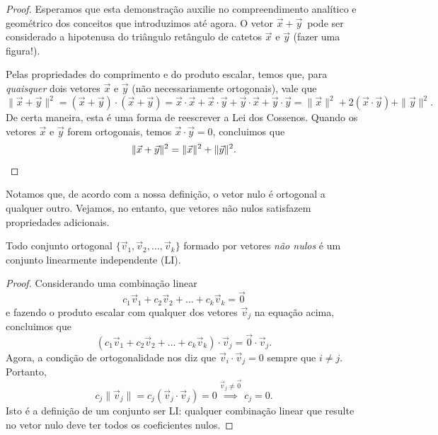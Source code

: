 \begin{proof}
	Esperamos que esta demonstração auxilie no compreendimento analítico e geométrico dos conceitos que introduzimos até agora. O vetor $\vec{x} + \vec{y} \,$ pode ser considerado a hipotenusa do triângulo retângulo de catetos $\vec{x}$ e $\vec{y}$ (fazer uma figura!).

	Pelas propriedades do comprimento e do produto escalar, temos que, para \textit{quaisquer} dois vetores $\vec{x}$ e $\vec{y}$ (não necessariamente ortogonais), vale que
	\begin{equation}
	\|\vec{x} + \vec{y}\|^2 = (\vec{x} + \vec{y}) \cdot (\vec{x} + \vec{y}) =  \vec{x} \cdot \vec{x} + \vec{x} \cdot \vec{y} +  \vec{y} \cdot \vec{x} +  \vec{y} \cdot \vec{y} = \|\vec{x}\|^2 + 2 (\vec{x} \cdot \vec{y}) + \|\vec{y}\|^2.
	\end{equation} De certa maneira, esta é uma forma de reescrever a Lei dos Cossenos. Quando os vetores $\vec{x}$ e $\vec{y}$ forem ortogonais, temos $\vec{x} \cdot \vec{y} = 0$, concluimos que
	\begin{equation}
	\|\vec{x} + \vec{y}\|^2 = \|\vec{x}\|^2 + \|\vec{y}\|^2. \qedhere
	\end{equation}
\end{proof}


Notamos que, de acordo com a nossa definição, o vetor nulo é ortogonal a qualquer outro. Vejamos, no entanto, que vetores não nulos satisfazem propriedades adicionais.

\begin{teo}
	Todo conjunto ortogonal $\{\vec{v}_1, \vec{v}_2, \dots, \vec{v}_k\}$ formado por vetores \textit{não nulos} é um conjunto linearmente independente (LI).
\end{teo}

\begin{proof}
	Considerando uma combinação linear
	\begin{equation}
	c_1 \vec{v}_1 + c_2 \vec{v}_2 + \dots + c_k \vec{v}_k = \vec{0}
	\end{equation} e fazendo o produto escalar com qualquer dos vetores $\vec{v}_j$ na equação acima, concluimos que
	\begin{equation}
	(c_1 \vec{v}_1 + c_2 \vec{v}_2 + \dots + c_k \vec{v}_k ) \cdot \vec{v}_j = \vec{0} \cdot \vec{v}_j.
	\end{equation} Agora, a condição de ortogonalidade nos diz que $\vec{v}_i \cdot \vec{v}_j = 0$ sempre que $i \neq j$. Portanto,
	\begin{equation}
	c_j \| \vec{v}_j \| = c_j (\vec{v}_j \cdot \vec{v}_j) = 0 \stackrel{\vec{v}_j \neq \vec{0}}{\implies} c_j = 0.
	\end{equation} Isto é a definição de um conjunto ser LI: qualquer combinação linear que resulte no vetor nulo deve ter todos os coeficientes nulos.
\end{proof}

